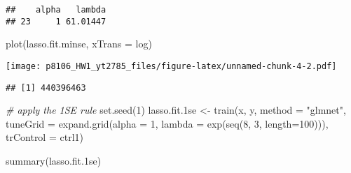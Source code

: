 \documentclass[
]{article}
\newenvironment{Shaded}{\begin{snugshade}}{\end{snugshade}}
\newcommand{\AttributeTok}[1]{\textcolor[rgb]{0.77,0.63,0.00}{#1}}
\newcommand{\CommentTok}[1]{\textcolor[rgb]{0.56,0.35,0.01}{\textit{#1}}}
\newcommand{\DecValTok}[1]{\textcolor[rgb]{0.00,0.00,0.81}{#1}}
\newcommand{\FloatTok}[1]{\textcolor[rgb]{0.00,0.00,0.81}{#1}}
\newcommand{\FunctionTok}[1]{\textcolor[rgb]{0.00,0.00,0.00}{#1}}
\newcommand{\NormalTok}[1]{#1}
\newcommand{\OtherTok}[1]{\textcolor[rgb]{0.56,0.35,0.01}{#1}}
\newcommand{\SpecialCharTok}[1]{\textcolor[rgb]{0.00,0.00,0.00}{#1}}
\newcommand{\StringTok}[1]{\textcolor[rgb]{0.31,0.60,0.02}{#1}}
\begin{document}
\begin{verbatim}
##    alpha   lambda
## 23     1 61.01447
\end{verbatim}

\begin{Shaded}
\begin{Highlighting}[]
\FunctionTok{plot}\NormalTok{(lasso.fit.minse, }\AttributeTok{xTrans =}\NormalTok{ log)}
\end{Highlighting}
\end{Shaded}

\texttt{[image: p8106\_HW1\_yt2785\_files/figure-latex/unnamed-chunk-4-2.pdf]}

\begin{Shaded}
\end{Shaded}

\begin{verbatim}
## [1] 440396463
\end{verbatim}

\begin{Shaded}
\begin{Highlighting}[]
\CommentTok{\# apply the 1SE rule}
\FunctionTok{set.seed}\NormalTok{(}\DecValTok{1}\NormalTok{)}
\NormalTok{lasso.fit}\FloatTok{.1}\NormalTok{se }\OtherTok{\textless{}{-}} \FunctionTok{train}\NormalTok{(x, y,}
                   \AttributeTok{method =} \StringTok{"glmnet"}\NormalTok{,}
                   \AttributeTok{tuneGrid =} \FunctionTok{expand.grid}\NormalTok{(}\AttributeTok{alpha =} \DecValTok{1}\NormalTok{, }
                                          \AttributeTok{lambda =} \FunctionTok{exp}\NormalTok{(}\FunctionTok{seq}\NormalTok{(}\DecValTok{8}\NormalTok{, }\DecValTok{3}\NormalTok{, }\AttributeTok{length=}\DecValTok{100}\NormalTok{))),}
                   \AttributeTok{trControl =}\NormalTok{ ctrl1)}

\FunctionTok{summary}\NormalTok{(lasso.fit}\FloatTok{.1}\NormalTok{se)}
\end{Highlighting}
\end{Shaded}
\end{document}
